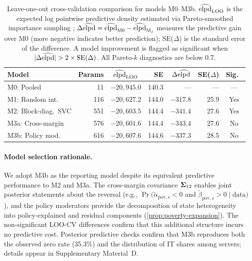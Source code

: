 \begin{table}[t]
\centering
\caption{Leave-one-out cross-validation comparison for models M0--M3b.
  $\widehat{\operatorname{elpd}}_{\text{LOO}}$ is the expected log pointwise predictive density
  estimated via Pareto-smoothed importance sampling
  \citep{VehtariEtAl2017}; $\Delta\widehat{\operatorname{elpd}} = \widehat{\operatorname{elpd}}_{\mathrm{M0}} - \widehat{\operatorname{elpd}}_{\mathrm{M}_j}$ measures the
  predictive gain over M0 (more negative indicates better prediction); SE($\Delta$) is the standard
  error of the difference. A model improvement is flagged as significant
  when $|\Delta\widehat{\operatorname{elpd}}| > 2 \times \mathrm{SE}(\Delta)$.
  All Pareto-$k$ diagnostics are below 0.7.}\label{tab:loo}
\smallskip
\begin{tabular}{@{}lrcrrrc@{}}
\toprule
Model & Params & $\widehat{\operatorname{elpd}}_{\text{LOO}}$ & SE &
  $\Delta\widehat{\operatorname{elpd}}$ & SE($\Delta$) & Sig.\ \\
\midrule
M0: Pooled          &  11 & $-20{,}945.0$ & 140.3 &
  ---   & ---  & ---    \\
M1: Random int.\    & 116 & $-20{,}627.2$ & 144.0 &
  $-317.8$ & 25.9 & Yes \\
M2: Block-diag.\ SVC & 551 & $-20{,}603.5$ & 144.4 &
  $-341.4$ & 27.6 & Yes \\
M3a: Cross-margin   & 576 & $-20{,}601.6$ & 144.4 &
  $-343.4$ & 27.6 & No  \\
M3b: Policy mod.\   & 616 & $-20{,}607.6$ & 144.6 &
  $-337.3$ & 28.5 & No  \\
\bottomrule
\end{tabular}
\end{table}

\paragraph{Model selection rationale.}
We adopt M3b as the reporting model despite its equivalent predictive
performance to M2 and M3a. The cross-margin covariance $\boldsymbol{\Sigma}_{12}$
enables joint posterior statements about the reversal (e.g.,
$\Pr(\tilde{\alpha}_{\mathrm{pov},s} < 0$ and
$\tilde{\beta}_{\mathrm{pov},s} > 0 \mid \mathrm{data})$), and the policy
moderators provide the decomposition of state heterogeneity into
policy-explained and residual components (\cref{prop:poverty-expansion}).
The non-significant LOO-CV differences confirm that this additional
structure incurs no predictive cost. Posterior predictive checks confirm
that M3b reproduces both the observed zero rate (35.3\%) and the
distribution of IT shares among servers; details appear in Supplementary
Material~D.

